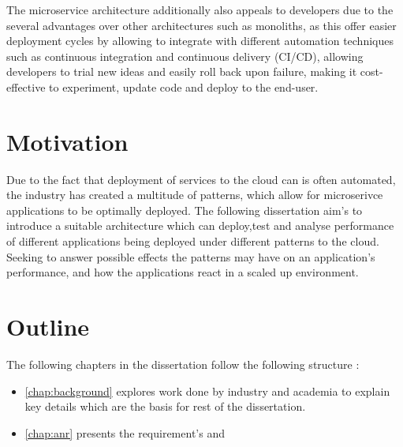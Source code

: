 The microservice architecture additionally also appeals to developers due to the several advantages over other architectures such as monoliths, as this offer easier deployment cycles by allowing to integrate with different automation techniques such as continuous integration and continuous delivery (CI/CD), allowing developers to trial new ideas and easily roll back upon failure, making it cost-effective to experiment, update code and deploy to the end-user.


\section{Motivation}
Due to the fact that deployment of services to the cloud can is often automated, the industry has created a multitude of patterns, which allow for microserivce applications to be optimally deployed. The following dissertation aim's to introduce a suitable architecture which can deploy,test and analyse performance of different applications being deployed under different patterns to the cloud. Seeking to answer possible effects the patterns may have on an application's performance, and how the applications react in a scaled up environment. 

\section{Outline}
The following chapters in the dissertation follow the following structure : 

\begin{itemize}
    \item \autoref{chap:background} explores work done by industry and academia to explain key details which are the basis for rest of the dissertation. 
    
    \item \autoref{chap:anr} presents the requirement's and  

\end{itemize}